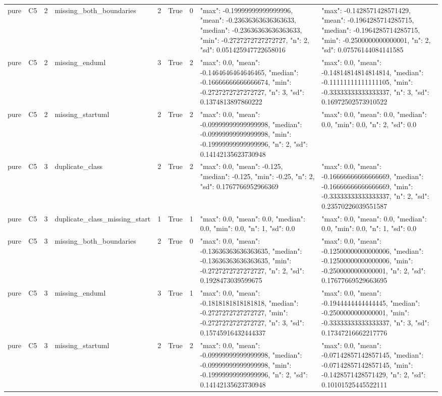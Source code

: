 \begin{tabular}{lllllllll}
pure & C5 & 2 & missing\_both\_boundaries & 2 & True & 0 & {"max": -0.19999999999999996, "mean": -0.23636363636363633, "median": -0.23636363636363633, "min": -0.2727272727272727, "n": 2, "sd": 0.051425947722658016} & {"max": -0.1428571428571429, "mean": -0.1964285714285715, "median": -0.1964285714285715, "min": -0.2500000000000001, "n": 2, "sd": 0.07576144084141585} \\
pure & C5 & 2 & missing\_enduml & 3 & True & 2 & {"max": 0.0, "mean": -0.1464646464646465, "median": -0.16666666666666674, "min": -0.2727272727272727, "n": 3, "sd": 0.1374813897860222} & {"max": 0.0, "mean": -0.14814814814814814, "median": -0.11111111111111105, "min": -0.33333333333333337, "n": 3, "sd": 0.16972502573910522} \\
pure & C5 & 2 & missing\_startuml & 2 & True & 2 & {"max": 0.0, "mean": -0.09999999999999998, "median": -0.09999999999999998, "min": -0.19999999999999996, "n": 2, "sd": 0.14142135623730948} & {"max": 0.0, "mean": 0.0, "median": 0.0, "min": 0.0, "n": 2, "sd": 0.0} \\
pure & C5 & 3 & duplicate\_class & 2 & True & 2 & {"max": 0.0, "mean": -0.125, "median": -0.125, "min": -0.25, "n": 2, "sd": 0.1767766952966369} & {"max": 0.0, "mean": -0.16666666666666669, "median": -0.16666666666666669, "min": -0.33333333333333337, "n": 2, "sd": 0.23570226039551587} \\
pure & C5 & 3 & duplicate\_class\_missing\_start & 1 & True & 1 & {"max": 0.0, "mean": 0.0, "median": 0.0, "min": 0.0, "n": 1, "sd": 0.0} & {"max": 0.0, "mean": 0.0, "median": 0.0, "min": 0.0, "n": 1, "sd": 0.0} \\
pure & C5 & 3 & missing\_both\_boundaries & 2 & True & 0 & {"max": 0.0, "mean": -0.13636363636363635, "median": -0.13636363636363635, "min": -0.2727272727272727, "n": 2, "sd": 0.1928473039599675} & {"max": 0.0, "mean": -0.12500000000000006, "median": -0.12500000000000006, "min": -0.2500000000000001, "n": 2, "sd": 0.17677669529663695} \\
pure & C5 & 3 & missing\_enduml & 3 & True & 1 & {"max": 0.0, "mean": -0.1818181818181818, "median": -0.2727272727272727, "min": -0.2727272727272727, "n": 3, "sd": 0.15745916432444337} & {"max": 0.0, "mean": -0.1944444444444445, "median": -0.2500000000000001, "min": -0.33333333333333337, "n": 3, "sd": 0.17347216662217776} \\
pure & C5 & 3 & missing\_startuml & 2 & True & 2 & {"max": 0.0, "mean": -0.09999999999999998, "median": -0.09999999999999998, "min": -0.19999999999999996, "n": 2, "sd": 0.14142135623730948} & {"max": 0.0, "mean": -0.07142857142857145, "median": -0.07142857142857145, "min": -0.1428571428571429, "n": 2, "sd": 0.10101525445522111} \\

\end{tabular}
